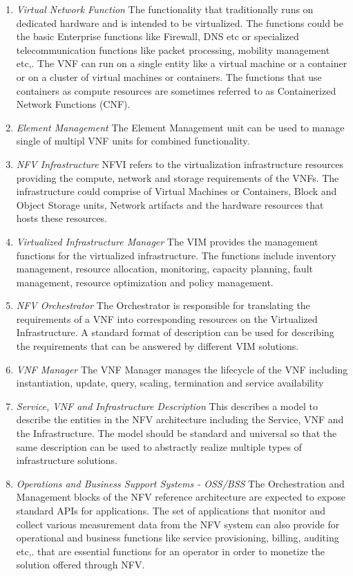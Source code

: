 \begin{enumerate}
    \item \textit{Virtual Network Function}
        The functionality that traditionally runs on dedicated hardware and is intended to be virtualized. The functions could be the basic Enterprise functions like Firewall, DNS etc or specialized telecommunication functions like packet processing, mobility management etc,. The VNF can run on a single entity like a virtual machine or a container or on a cluster of virtual machines or containers. The functions that use containers as compute resources are sometimes referred to as Containerized Network Functions (CNF). 
    \item \textit{Element Management}
        The Element Management unit can be used to manage single of multipl VNF units for combined functionality. 
    \item \textit{NFV Infrastructure}
        NFVI refers to the virtualization infrastructure resources providing the compute, network and storage requirements of the VNFs. The infrastructure could comprise of Virtual Machines or Containers, Block and Object Storage units, Network artifacts and the hardware resources that hosts these resources.   
    \item \textit{Virtualized Infrastructure Manager}
        The VIM provides the management functions for the virtualized infrastructure. The functions include inventory management, resource allocation, monitoring, capacity planning, fault management, resource optimization and policy management.
    \item \textit{NFV Orchestrator}
        The Orchestrator is responsible for translating the requirements of a VNF into corresponding resources on the Virtualized Infrastructure. A standard format of description can be used for describing the requirements that can be answered by different VIM solutions.
    \item \textit{VNF Manager}
        The VNF Manager manages the lifecycle of the VNF including instantiation, update, query, scaling, termination and service availability
    \item \textit{Service, VNF and Infrastructure Description}
        This describes a model to describe the entities in the NFV architecture including the Service, VNF and the Infrastructure. The model should be standard and universal so that the same description can be used to abstractly realize multiple types of infrastructure solutions. 
    \item \textit{Operations and Business Support Systems - OSS/BSS}
        The Orchestration and Management blocks of the NFV reference architecture are expected to expose standard APIs for applications. The set of applications that monitor and collect various measurement data from the NFV system can also provide for operational and business functions like service provisioning, billing, auditing etc,. that are essential functions for an operator in order to monetize the solution offered through NFV.
\end{enumerate}
